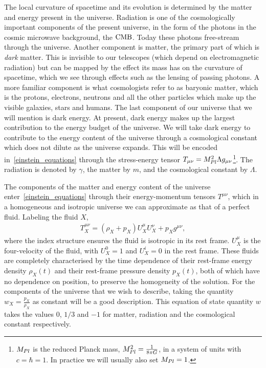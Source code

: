     The local curvature of spacetime and its evolution is determined by the matter and energy
    present in the universe.
    Radiation is one of the cosmologically important components of the present universe, in the form of the
    photons in the cosmic microwave background, the $\text{CMB}$.
    Today these photons free-stream through the universe.
    Another component is matter, the primary part of which
    is \textit{dark} matter.
    This is invisible to our telescopes (which depend on electromagnetic radiation) but can be mapped by the
    effect its mass has on the curvature of spacetime, which we see through
    effects such as the lensing of passing photons.
    A more familiar component is what cosmologists refer to as baryonic matter, which is
    the protons, electrons, neutrons and all the other particles which make up the visible galaxies, stars
    and humans.
    The last component of our universe that we will mention is dark energy.
    At present, dark energy makes up the largest contribution to the
    energy budget of the universe.
    We will take dark energy to contribute to the energy content of the
    universe through a cosmological constant which does not
    dilute as the universe expands.
    This will be encoded in~\eqref{einstein_equations}
    through the stress-energy tensor $T_{\mu\nu}=M_{Pl}^2\Lambda g_{\mu\nu}$\footnote{
        $M_{Pl}$ is the reduced Planck mass, $M_{Pl}^2=\frac{1}{8\pi G}$,
        in a system of units with $c=\hbar=1$.
        In practice we will usually also set $M_{Pl}=1$.
    }.
    The radiation is denoted by $\gamma$,
    the matter by $m$, and the cosmological constant by $\Lambda$.


    The components of the matter and energy content of the universe enter~\eqref{einstein_equations} through
    their energy-momentum tensors $T^{\mu\nu}$, which in a homogeneous and isotropic universe
    we can approximate as that of a perfect fluid. Labeling the fluid $X$,
    \begin{align}\label{stress_tensor}
        T_X^{\mu\nu} = (\rho_X+p_X)U_X^\mu U_X^\nu+p_Xg^{\mu\nu},
    \end{align}
    where the index structure ensures the fluid is isotropic in its rest frame.
    $U_X^\mu$ is the four-velocity of the fluid, with $U_X^0=1$ and $U_X^i=0$
    in the rest frame.
    These fluids are completely characterised by the time dependence
    of their rest-frame energy density $\rho_X(t)$ and their rest-frame
    pressure density $p_X(t)$,
    both of which have no dependence on position, to preserve the homogeneity of the solution.
    For the components of the universe that we wish to describe,
    taking the quantity $w_X=\frac{p_X}{\rho_X}$ as constant will be a good description.
    This equation of state quantity $w$ takes the values $0$, $1/3$ and $-1$ for matter, radiation
    and the cosmological constant respectively.


